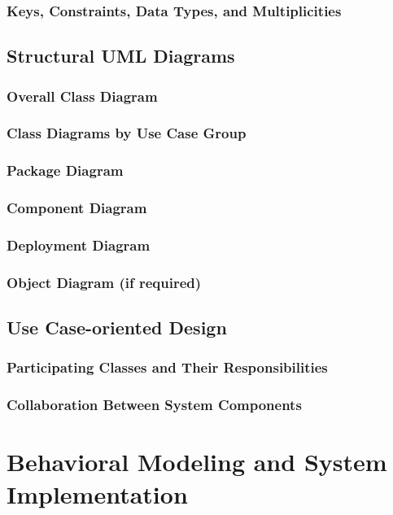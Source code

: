 \documentclass[a4paper,12pt]{article}
\begin{document}
\subsubsection{Keys, Constraints, Data Types, and Multiplicities}

\subsection{Structural UML Diagrams}
\subsubsection{Overall Class Diagram}
\subsubsection{Class Diagrams by Use Case Group}
\subsubsection{Package Diagram}
\subsubsection{Component Diagram}
\subsubsection{Deployment Diagram}
\subsubsection{Object Diagram (if required)}

\subsection{Use Case-oriented Design}
\subsubsection{Participating Classes and Their Responsibilities}
\subsubsection{Collaboration Between System Components}

\section{Behavioral Modeling and System Implementation}
\end{document}
